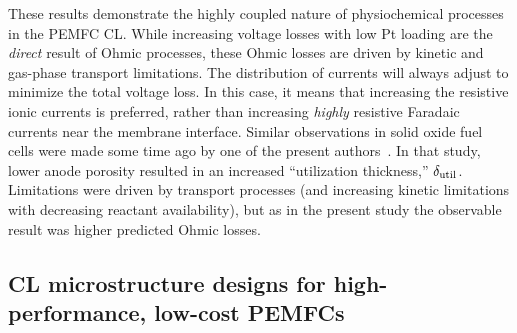\documentclass[final,3p,times,twocolumn]{elsarticle}    %
\begin{document}
These results demonstrate the highly coupled nature of physiochemical processes in the PEMFC CL. While increasing voltage losses with low Pt loading are the \emph{direct} result of Ohmic processes, these Ohmic losses are driven by kinetic and gas-phase transport limitations. The distribution of currents will always adjust to minimize the total voltage loss. In this case, it means that increasing the resistive ionic currents is preferred, rather than increasing \emph{highly} resistive Faradaic currents near the membrane interface. Similar observations in solid oxide fuel cells  were made some time ago by one of the present authors~\cite{bib:decaluwe_2008}. In that study, lower anode porosity resulted in an increased ``utilization thickness,'' $\delta_{\rm util}$. Limitations were driven by transport processes (and increasing kinetic limitations with decreasing reactant availability), but as in the present study the observable result was higher predicted Ohmic losses.



\subsection{CL microstructure designs for high-performance, low-cost PEMFCs}
\label{sect:design_study}
\end{document}

